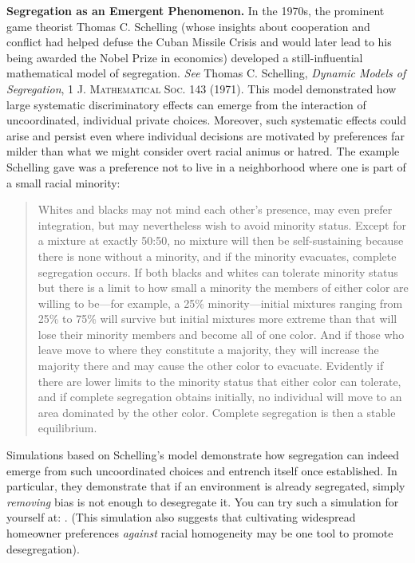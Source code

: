 \begin{questions}
\item \textbf{Segregation as an Emergent Phenomenon.} In the 1970s, the
prominent game theorist Thomas C. Schelling (whose insights about cooperation
and conflict had helped defuse the Cuban Missile Crisis and would later lead to
his being awarded the Nobel Prize in economics) developed a still-influential
mathematical model of segregation. \textit{See} Thomas C. Schelling,
\textit{Dynamic Models of Segregation}, 1 \textsc{J. Mathematical Soc.} 143
(1971). This model demonstrated how large systematic discriminatory effects can
emerge from the interaction of uncoordinated, individual private choices.
Moreover, such systematic effects could arise and persist even where individual
decisions are motivated by preferences far milder than what we might consider
overt racial animus or hatred. The example Schelling gave was a preference not
to live in a neighborhood where one is part of a small racial minority:
\begin{quote}
Whites and blacks may not mind each other's presence, may even prefer
integration, but may nevertheless wish to avoid minority status. Except for a
mixture at exactly 50:50, no mixture will then be self-sustaining because there
is none without a minority, and if the minority evacuates, complete segregation
occurs. If both blacks and whites can tolerate minority status but there is a
limit to how small a minority the members of either color are willing to
be---for example, a 25\% minority---initial mixtures ranging from 25\% to 75\%
will survive but initial mixtures more extreme than that will lose their
minority members and become all of one color. And if those who leave move to
where they constitute a majority, they will increase the majority there and may
cause the other color to evacuate. Evidently if there are lower limits to the
minority status that either color can tolerate, and if complete segregation
obtains initially, no individual will move to an area dominated by the other
color. Complete segregation is then a stable equilibrium.
\end{quote}



Simulations based on Schelling's model demonstrate how segregation can indeed
emerge from such uncoordinated choices and entrench itself once established. In
particular, they demonstrate that if an environment is already segregated,
simply \textit{removing} bias is not enough to desegregate it. You can try such
a simulation for yourself at: . (This
simulation also suggests that cultivating widespread homeowner preferences
\textit{against} racial homogeneity may be one tool to promote desegregation). 



\end{questions}
